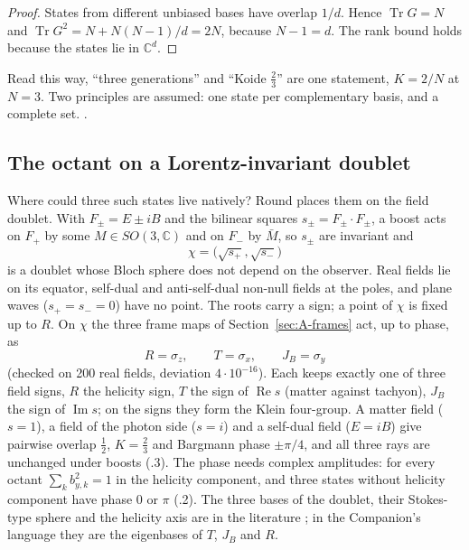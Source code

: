 \begin{proof}
States from different unbiased bases have overlap $1/d$. Hence $\operatorname{Tr}G=N$ and
$\operatorname{Tr}G^2=N+N(N-1)/d=2N$, because $N-1=d$. The rank bound holds because the states lie in $\mathbb C^d$.
\end{proof}

Read this way, ``three generations'' and ``Koide $\tfrac23$'' are one statement, $K=2/N$ at $N=3$. Two principles are assumed:
one state per complementary basis, and a complete set. \Reading.

\subsection{The octant on a Lorentz-invariant doublet}
\label{sec:B-doublet}

Where could three such states live natively? Round  places them on the field doublet. With $F_\pm=E\pm iB$ and the
bilinear squares $s_\pm=F_\pm\cdot F_\pm$, a boost acts on $F_+$ by some $M\in SO(3,\mathbb C)$ and on $F_-$ by $\bar M$, so
$s_\pm$ are invariant and
\begin{equation}
 \chi=\bigl(\sqrt{s_+},\sqrt{s_-}\bigr)
 \label{eq:B-chi}
\end{equation}
is a doublet whose Bloch sphere does not depend on the observer. Real fields lie on its equator, self-dual and anti-self-dual
non-null fields at the poles, and plane waves ($s_+=s_-=0$) have no point. The roots carry a sign; a point of $\chi$ is fixed
up to $R$. On $\chi$ the three frame maps of Section~\ref{sec:A-frames} act, up to phase, as
\begin{equation}
 R=\sigma_z,\qquad T=\sigma_x,\qquad J_B=\sigma_y
 \label{eq:B-frame-pauli}
\end{equation}
(checked on 200 real fields, deviation $4\cdot10^{-16}$). Each keeps exactly one of three field signs, $R$ the helicity sign,
$T$ the sign of $\operatorname{Re}s$ (matter against tachyon), $J_B$ the sign of $\operatorname{Im}s$; on the signs they form
the Klein four-group. A matter field ($s=1$), a field of the photon side ($s=i$) and a self-dual field ($E=iB$) give pairwise
overlap $\tfrac12$, $K=\tfrac23$ and Bargmann phase $\pm\pi/4$, and all three rays are unchanged under boosts (.3).
The phase needs complex amplitudes: for every octant $\sum_kb_{y,k}^2=1$ in the helicity component, and three states without
helicity component have phase $0$ or $\pi$ (.2). The three bases of the doublet, their Stokes-type sphere and the
helicity axis are in the literature \cite{A-Golat2024}; in the Companion's language they are the eigenbases of $T$, $J_B$ and $R$.

